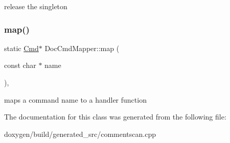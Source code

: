 release the singleton \mbox{\label{class_doc_cmd_mapper_a983c735e46e800262105205573abfbbb}} 
\subsubsection{\texorpdfstring{map()}{map()}}
{\footnotesize\ttfamily static \mbox{\hyperlink{struct_doc_cmd_mapper_1_1_cmd}{Cmd}}$\ast$ Doc\+Cmd\+Mapper\+::map (\begin{DoxyParamCaption}\item[{const char $\ast$}]{name }\end{DoxyParamCaption})\hspace{0.3cm}{\ttfamily [inline]}, {\ttfamily [static]}}

maps a command name to a handler function 

The documentation for this class was generated from the following file\+:\begin{DoxyCompactItemize}
\item 
doxygen/build/generated\+\_\+src/commentscan.\+cpp\end{DoxyCompactItemize}
